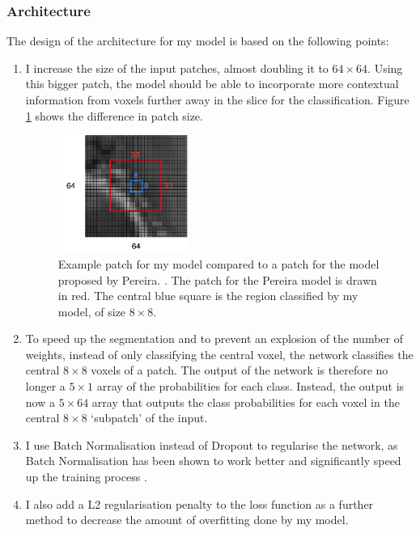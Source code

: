 \documentclass[12pt,a4paper,twoside,openright]{report}
\begin{document}
\subsubsection{Architecture}
The design of the architecture for my model is based on the following points:
\begin{enumerate}
	\item I increase the size of the input patches, almost doubling it to $64 \times 64$. Using this bigger patch, the model should be able to incorporate more contextual information from voxels further away in the slice for the classification. Figure \ref{fig:bigger_patches} shows the difference in patch size.
		\begin{figure}
			\centering
			\includegraphics[width=0.4\textwidth]{bigger_patches}
			\caption[Example patch for my model compared to a patch for the model proposed by Pereira.]{Example patch for my model compared to a patch for the model proposed by Pereira. \cite{pereira}. The patch for the Pereira model is drawn in red. The central blue square is the region classified by my model, of size $8 \times 8$.}
			\label{fig:bigger_patches}
		\end{figure}
	\item To speed up the segmentation and to prevent an explosion of the number of weights, instead of only classifying the central voxel, the network classifies the central $8 \times 8$ voxels of a patch. The output of the network is therefore no longer a $5 \times 1$ array of the probabilities for each class. Instead, the output is now a $5 \times 64$ array that outputs the class probabilities for each voxel in the central $8 \times 8$ `subpatch' of the input. 
	\item I use Batch Normalisation instead of Dropout to regularise the network, as Batch Normalisation has been shown to work better and significantly speed up the training process \cite{batch_normalization}. 
	\item I also add a L2 regularisation penalty to the loss function as a further method to decrease the amount of overfitting done by my model.

\end{enumerate}
\end{document}
